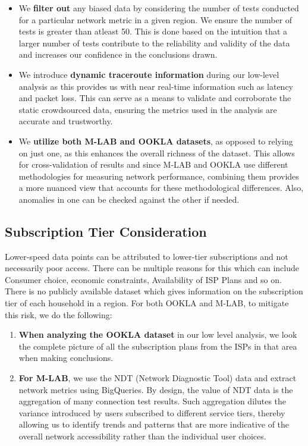 \documentclass[conference]{IEEEtran}
\begin{document}
\begin{itemize}
    \item We \textbf{filter out} any biased data by considering the number of tests conducted for a particular network metric in a given region. We ensure the number of tests is greater than atleast 50. This is done based on the intuition that a larger number of tests contribute to the reliability and validity of the data and increases our confidence in the conclusions drawn.
    \item We introduce \textbf{dynamic traceroute information} during our low-level analysis as this provides us with near real-time information such as latency and packet loss. This can serve as a means to validate and corroborate the static crowdsourced data, ensuring the metrics used in the analysis are accurate and trustworthy.
    \item We \textbf{utilize both M-LAB and OOKLA datasets}, as opposed to relying on just one, as this enhances the overall richness of the dataset. This allows for cross-validation of results and since M-LAB and OOKLA use different methodologies for measuring network performance, combining them provides a more nuanced view that accounts for these methodological differences. Also, anomalies in one can be checked against the other if needed.
\end{itemize}

\subsection{Subscription Tier Consideration}
Lower-speed data points can be attributed to lower-tier subscriptions and not necessarily poor access. There can be multiple reasons for this which can include Consumer choice, economic constraints, Availability of ISP Plans and so on. There is no publicly available dataset which gives information on the subscription tier of each household in a region.
For both OOKLA and M-LAB, to mitigate this risk, we do the following:
\begin{enumerate}
    \item \textbf{When analyzing the OOKLA dataset} in our low level analysis, we look the complete picture of all the subscription plans from the ISPs in that area when making conclusions.
    \item \textbf{For M-LAB}, we use the NDT (Network Diagnostic Tool) data and extract network metrics using BigQueries. By design, the value of NDT data is the aggregation of many connection test results. Such aggregation dilutes the variance introduced by users subscribed to different service tiers, thereby allowing us to identify trends and patterns that are more indicative of the overall network accessibility rather than the individual user choices.
\end{enumerate}
\end{document}
